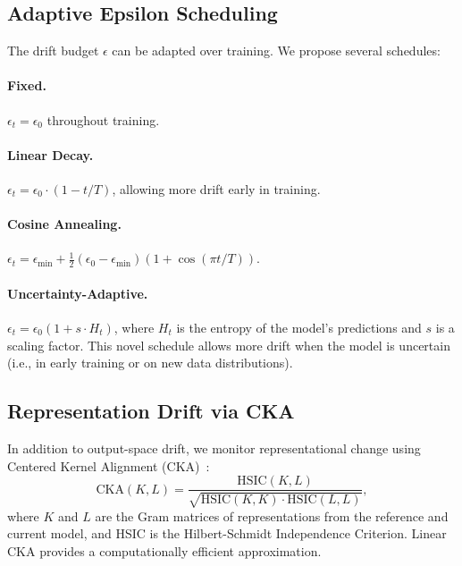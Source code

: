 \documentclass{article}
\begin{document}
\subsection{Adaptive Epsilon Scheduling}

The drift budget $\epsilon$ can be adapted over training. We propose several schedules:

\paragraph{Fixed.} $\epsilon_t = \epsilon_0$ throughout training.

\paragraph{Linear Decay.} $\epsilon_t = \epsilon_0 \cdot (1 - t/T)$, allowing more drift early in training.

\paragraph{Cosine Annealing.} $\epsilon_t = \epsilon_{\min} + \frac{1}{2}(\epsilon_0 - \epsilon_{\min})(1 + \cos(\pi t / T))$.

\paragraph{Uncertainty-Adaptive.} $\epsilon_t = \epsilon_0 (1 + s \cdot H_t)$, where $H_t$ is the entropy of the model's predictions and $s$ is a scaling factor. This novel schedule allows more drift when the model is uncertain (i.e., in early training or on new data distributions).


\subsection{Representation Drift via CKA}

In addition to output-space drift, we monitor representational change using Centered Kernel Alignment (CKA)~\citep{kornblith2019similarity}:
\begin{equation}
\text{CKA}(K, L) = \frac{\text{HSIC}(K, L)}{\sqrt{\text{HSIC}(K, K) \cdot \text{HSIC}(L, L)}},
\end{equation}
where $K$ and $L$ are the Gram matrices of representations from the reference and current model, and HSIC is the Hilbert-Schmidt Independence Criterion. Linear CKA provides a computationally efficient approximation.
\end{document}
